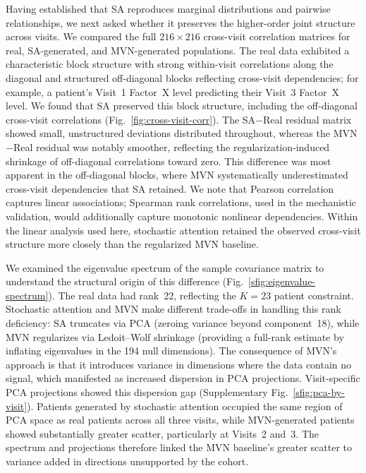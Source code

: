 Having established that SA reproduces marginal distributions and pairwise
relationships, we next asked whether it preserves the higher-order joint structure
across visits. We compared the full $216 \times 216$ cross-visit correlation matrices for real,
SA-generated, and MVN-generated populations. The real data exhibited a characteristic
block structure with strong within-visit correlations along the diagonal and
structured off-diagonal blocks reflecting cross-visit dependencies; for example,
a patient's Visit~1 Factor~X level predicting their Visit~3 Factor~X level. We found
that SA preserved this block structure, including the off-diagonal cross-visit
correlations (Fig.~\ref{fig:cross-visit-corr}). The SA$-$Real residual matrix showed
small, unstructured deviations distributed throughout, whereas the MVN$-$Real residual
was notably smoother, reflecting the regularization-induced shrinkage of off-diagonal
correlations toward zero. This difference was most apparent in the off-diagonal blocks,
where MVN systematically underestimated cross-visit dependencies that SA retained.
We note that Pearson correlation captures linear associations; Spearman rank
correlations, used in the mechanistic validation, would additionally capture
monotonic nonlinear dependencies. Within the linear analysis used here, stochastic attention
retained the observed cross-visit structure more closely than the regularized MVN baseline.

We examined the eigenvalue spectrum of the sample covariance matrix to understand the
structural origin of this difference (Fig.~\ref{sfig:eigenvalue-spectrum}). The real data had
rank~22, reflecting the $K{=}23$ patient constraint. Stochastic attention and MVN make different
trade-offs in handling this rank deficiency: SA truncates via PCA (zeroing variance
beyond component~18), while MVN regularizes via Ledoit--Wolf shrinkage (providing a
full-rank estimate by inflating eigenvalues in the 194 null dimensions). The
consequence of MVN's approach is that it introduces variance in dimensions where the
data contain no signal, which manifested as increased dispersion in PCA projections.
Visit-specific PCA projections showed this dispersion gap (Supplementary Fig.~\ref{sfig:pca-by-visit}).
Patients generated by stochastic attention occupied the same region of PCA space as real
patients across all three visits, while MVN-generated patients showed substantially greater scatter,
particularly at Visits~2 and~3. The spectrum and projections therefore linked the MVN
baseline's greater scatter to variance added in directions unsupported by the cohort.

